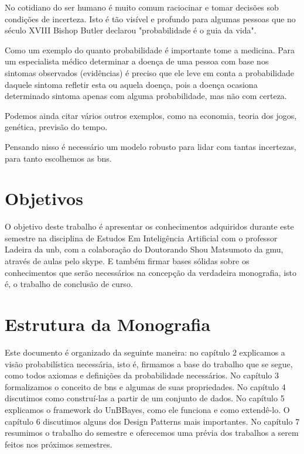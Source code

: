 No cotidiano do ser humano é muito comum raciocinar e tomar decisões sob condições de incerteza. Isto é tão visível e profundo para algumas pessoas que no século XVIII Bishop Butler declarou "probabilidade é o guia da vida".

Como um exemplo do quanto probabilidade é importante tome a medicina. Para um especialista médico determinar a doença de uma pessoa com base nos sintomas observados (evidências) é preciso que ele leve em conta a probabilidade daquele sintoma refletir esta ou aquela doença, pois a doença ocasiona determinado sintoma apenas com alguma probabilidade, mas não com certeza.

Podemos ainda citar vários outros exemplos, como na economia, teoria dos jogos, genética, previsão do tempo.

Pensando nisso é necessário um modelo robusto para lidar com tantas incertezas, para tanto escolhemos as \glspl{bn}.


\section{Objetivos}
O objetivo deste trabalho é apresentar os conhecimentos adquiridos durante este semestre na disciplina de Estudos Em Inteligência Artificial com o professor Ladeira da \gls{unb}, com a colaboração do Doutorando Shou Matsumoto da \gls{gmu}, através de aulas pelo skype. E também firmar bases sólidas sobre os conhecimentos que serão necessários na concepção da verdadeira monografia, isto é, o trabalho de conclusão de curso.


\section{Estrutura da Monografia}
Este documento é organizado da seguinte maneira: no capítulo 2 explicamos a visão probabilística necessária, isto é, firmamos a base do trabalho que se segue, como todos axiomas e definições da probabilidade necessários. No capítulo 3 formalizamos o conceito de \glspl{bn} e algumas de suas propriedades. No capítulo 4 discutimos como construí-las a partir de um conjunto de dados. No capítulo 5 explicamos o framework do UnBBayes, como ele funciona e como extendê-lo. O capítulo 6 discutimos alguns dos Design Patterns mais importantes. No capítulo 7 resumimos o trabalho do semestre e oferecemos uma prévia dos trabalhos a serem feitos nos próximos semestres.


